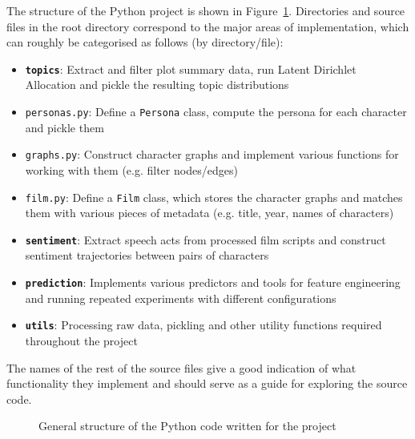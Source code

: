 \documentclass[bsc,frontabs,deptreport,singlespacing,parskip, twoside]{infthesis}
\begin{document}
The structure of the Python project is shown in Figure~\ref{fig:dirtree}. Directories and source files in the root directory correspond to the major areas of implementation, which can roughly be categorised as follows (by directory/file):
\begin{itemize}
	\item \texttt{\textbf{topics}}:  Extract and filter plot summary data, run Latent Dirichlet Allocation and pickle the resulting topic distributions
	\item \texttt{personas.py}: Define a \texttt{Persona} class, compute the persona for each character and pickle them
	\item \texttt{graphs.py}: Construct character graphs and implement various functions for working with them (e.g. filter nodes/edges)
	\item \texttt{film.py}: Define a \texttt{Film} class, which stores the character graphs and matches them with various pieces of metadata (e.g. title, year, names of characters)
	\item \texttt{\textbf{sentiment}}: Extract speech acts from processed film scripts and construct sentiment trajectories between pairs of characters
	\item \texttt{\textbf{prediction}}: Implements various predictors and tools for feature engineering and running repeated experiments with different configurations
	\item \texttt{\textbf{utils}}: Processing raw data, pickling and other utility functions required throughout the project
\end{itemize}

The names of the rest of the source files give a good indication of what functionality they implement and should serve as a guide for exploring the source code.

\hspace{.1in}
\begin{figure}[ht!]
\caption{General structure of the Python code written for the project}
\label{fig:dirtree}
\end{figure}
\end{document}
